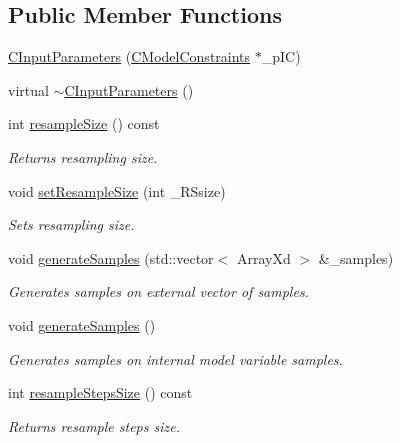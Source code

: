 \subsection*{Public Member Functions}
\begin{DoxyCompactItemize}
\item 
\hyperlink{class_go_s_u_m_1_1_c_input_parameters_a1d2c088e6335ce2ff4b10ff5964cb9b9}{C\-Input\-Parameters} (\hyperlink{class_go_s_u_m_1_1_c_model_constraints}{C\-Model\-Constraints} $\ast$\-\_\-p\-I\-C)
\item 
virtual \hyperlink{class_go_s_u_m_1_1_c_input_parameters_ac9d5bfe8ecf12ccc78dc1327b4d4765d}{$\sim$\-C\-Input\-Parameters} ()
\item 
int \hyperlink{class_go_s_u_m_1_1_c_input_parameters_a7d9e6f3799e28997cc1b3d1071804eda}{resample\-Size} () const 
\begin{DoxyCompactList}\small\item\em Returns resampling size. \end{DoxyCompactList}\item 
void \hyperlink{class_go_s_u_m_1_1_c_input_parameters_a7be5d110240bdd04b150cd7e511837fc}{set\-Resample\-Size} (int \-\_\-\-R\-Ssize)
\begin{DoxyCompactList}\small\item\em Sets resampling size. \end{DoxyCompactList}\item 
void \hyperlink{class_go_s_u_m_1_1_c_input_parameters_a1bb1435964c789f0cfa311e78d165ed8}{generate\-Samples} (std\-::vector$<$ Array\-Xd $>$ \&\-\_\-samples)
\begin{DoxyCompactList}\small\item\em Generates samples on external vector of samples. \end{DoxyCompactList}\item 
void \hyperlink{class_go_s_u_m_1_1_c_input_parameters_a63b7df5e450248ad37f9ac17adb0373b}{generate\-Samples} ()
\begin{DoxyCompactList}\small\item\em Generates samples on internal model variable samples. \end{DoxyCompactList}\item 
int \hyperlink{class_go_s_u_m_1_1_c_input_parameters_a3bd69f7c2974ffba079630fcc1502e38}{resample\-Steps\-Size} () const 
\begin{DoxyCompactList}\small\item\em Returns resample steps size. \end{DoxyCompactList}\item 

\end{DoxyCompactItemize}
